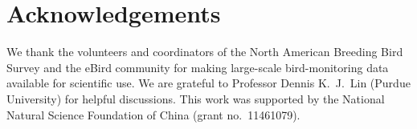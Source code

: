 \documentclass[preprint,12pt]{elsarticle}
\theoremstyle{definition}
\begin{document}
\section*{Acknowledgements}

We thank the volunteers and coordinators of the North American Breeding Bird
Survey and the eBird community for making large-scale bird-monitoring data
available for scientific use. We are grateful to Professor Dennis K.\ J.\ Lin
(Purdue University) for helpful discussions. This work was supported by the
National Natural Science Foundation of China (grant no.\ 11461079).

\end{document}
